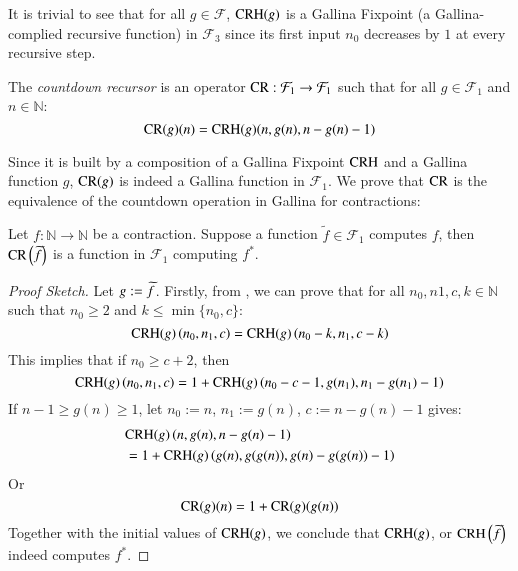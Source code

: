 It is trivial to see that for all $g\in \mathcal{F}$, 
$\text{CRH}(g)$ is a Gallina Fixpoint (a Gallina-complied 
recursive function) in $\mathcal{F}_3$ since its first 
input $n_0$ decreases by $1$ at every recursive step.

\begin{defn} \label{defn: countdown rec}
The \textit{countdown recursor} is an operator 
$\text{CR} : \mathcal{F}_1 \to \mathcal{F}_1$ such that for 
all $g\in \mathcal{F}_1$ and $n\in \mathbb{N}$:
\begin{equation}
\text{CR}(g)(n) = \text{CRH}(g)(n, g(n), n - g(n) - 1)
\end{equation}
\end{defn}

Since it is built by a composition of a Gallina Fixpoint 
$\text{CRH}$ and a Gallina function $g$, $\text{CR}(g)$ is indeed a 
Gallina function in $\mathcal{F}_1$. We prove that $\text{CR}$ 
is the equivalence of the countdown operation in Gallina 
for contractions:

\begin{lem} \label{lem: CRH_countdown}
Let $f: \mathbb{N}\to \mathbb{N}$ be a contraction. Suppose 
a function $\widetilde{f}\in \mathcal{F}_1$ computes $f$, 
then $\text{CR}\left(\widetilde{f}\right)$ is a function in 
$\mathcal{F}_1$ computing $f^*$.
\end{lem}

\begin{proof}[Proof Sketch]
Let $g := \widetilde{f}$.
Firstly, from , we can prove 
that for all $n_0, n1, c, k\in \mathbb{N}$ such that $n_0\ge 2$ 
and $k\le \min\{n_0, c\}$:
\begin{equation*}
\text{CRH}(g)\left(n_0, n_1, c\right) = \text{CRH}(g)\left(n_0 - k, n_1, c - k\right)
\end{equation*}
This implies that if $n_0\ge c + 2$, then
\begin{equation*}
\text{CRH}(g)\left(n_0, n_1, c\right) = 1 + \text{CRH}(g)\left(n_0 - c - 1, g(n_1), n_1 - g(n_1) - 1\right)
\end{equation*}
If $n - 1\ge g(n) \ge 1$, let $n_0 := n$, $n_1 := g(n)$, $c := n - g(n) - 1$ gives:
\begin{equation*}
\begin{aligned}
& \text{CRH}(g)\left(n, g(n), n - g(n) - 1\right) \\
& = 1 + \text{CRH}(g)\left(g(n), g(g(n)), g(n) - g(g(n)) - 1\right)
\end{aligned}
\end{equation*}
Or
\begin{equation*}
\text{CR}(g)(n) = 1 + \text{CR}(g)(g(n))
\end{equation*}
Together with the initial values of $\text{CRH}(g)$, we conclude 
that $\text{CRH}(g)$, or $\text{CRH}\left(\widetilde{f}\right)$ indeed computes $f^*$.

\end{proof}

